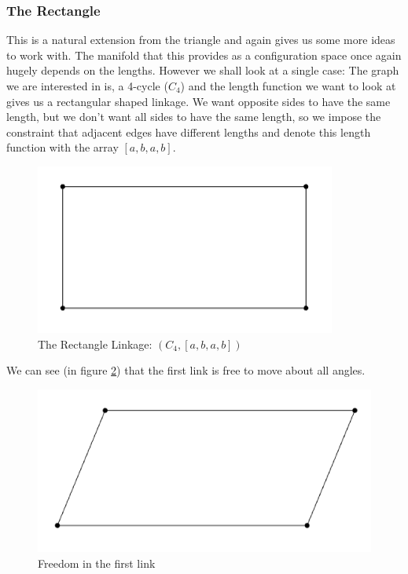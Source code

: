 \documentclass{article}
\begin{document}
\subsubsection{The Rectangle}

This is a natural extension from the triangle and again gives us some more ideas to work with. The manifold that this provides as a configuration space once again hugely depends on the lengths. However we shall look at a single case: The graph we are interested in is, a 4-cycle ($C_4$) and the length function we want to look at gives us a rectangular shaped linkage. We want opposite sides to have the same length, but we don't want all sides to have the same length, so we impose the constraint that adjacent edges have different lengths and denote this length function with the array $[a,b,a,b]$.

\begin{figure}[h!]
\centering
\includegraphics[scale=0.5]{./images/rectangle.png} 
\caption{The Rectangle Linkage: $(C_4, [a,b,a,b])$}
\label{fig:The Rectangle Linkage}
\end{figure}

\noindent We can see (in figure \ref{fig:Rectangle Skewed}) that the first link is free to move about all angles.

\begin{figure}[h!]
\centering
\includegraphics[scale=0.4]{./images/rectangle_skewed.png}
\caption{Freedom in the first link}
\label{fig:Rectangle Skewed}
\end{figure}
\end{document}
